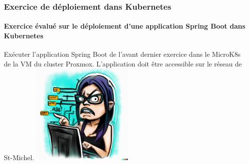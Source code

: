 \documentclass{beamer}
\begin{document}
    \begin{frame}
        \transdissolve
        \frametitle{Exercice de déploiement dans Kubernetes}
        \framesubtitle{Exercice évalué sur le déploiement d'une application Spring Boot dans Kubernetes}
        Exécuter l'application Spring Boot  de l'avant dernier exercice dans le MicroK8s de la VM du cluster Proxmox.
        \bigbreak
        L'application doit être accessible sur le réseau de St-Michel.
        \bigbreak
        \centering
        \includegraphics[width=5cm]{image/maniac-programmer-sorting-her-code.png}
    \end{frame}
\end{document}
